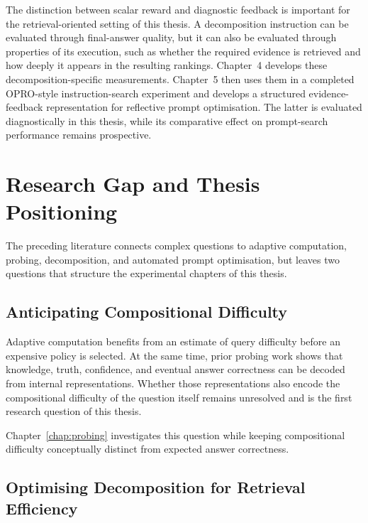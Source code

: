 The distinction between scalar reward and diagnostic feedback is important for
the retrieval-oriented setting of this thesis. A decomposition instruction can
be evaluated through final-answer quality, but it can also be evaluated through
properties of its execution, such as whether the required evidence is retrieved
and how deeply it appears in the resulting rankings. Chapter~4 develops these
decomposition-specific measurements. Chapter~5 then uses them in a completed
OPRO-style instruction-search experiment and develops a structured
evidence-feedback representation for reflective prompt optimisation. The latter
is evaluated diagnostically in this thesis, while its comparative effect on
prompt-search performance remains prospective.


\section{Research Gap and Thesis Positioning}
\label{sec:research-gap}

The preceding literature connects complex questions to adaptive computation,
probing, decomposition, and automated prompt optimisation, but leaves two
questions that structure the experimental chapters of this thesis.

\subsection{Anticipating Compositional Difficulty}
\label{subsec:gap-difficulty}

Adaptive computation benefits from an estimate of query difficulty before an
expensive policy is selected. At the same time, prior probing work shows that
knowledge, truth, confidence, and eventual answer correctness can be decoded
from internal representations. Whether those representations also encode the
compositional difficulty of the question itself remains unresolved and is the
first research question of this thesis.

\begin{center}
\end{center}

Chapter~\ref{chap:probing} investigates this question while keeping
compositional difficulty conceptually distinct from expected answer correctness.

\subsection{Optimising Decomposition for Retrieval Efficiency}
\label{subsec:gap-efficient-decomposition}

